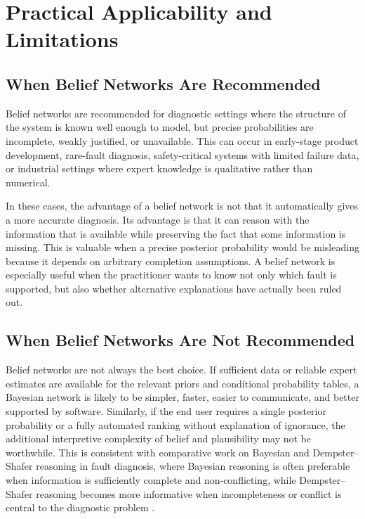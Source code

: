 \documentclass[runningheads]{llncs}
\begin{document}
\section{Practical Applicability and Limitations}
\label{sec:practical_guidance}

\subsection{When Belief Networks Are Recommended}
\label{sec:when_recommended}

Belief networks are recommended for diagnostic settings where the structure of the system is known well enough to model, but precise probabilities are incomplete, weakly justified, or unavailable. This can occur in early-stage product development, rare-fault diagnosis, safety-critical systems with limited failure data, or industrial settings where expert knowledge is qualitative rather than numerical.

In these cases, the advantage of a belief network is not that it automatically gives a more accurate diagnosis. Its advantage is that it can reason with the information that is available while preserving the fact that some information is missing. This is valuable when a precise posterior probability would be misleading because it depends on arbitrary completion assumptions. A belief network is especially useful when the practitioner wants to know not only which fault is supported, but also whether alternative explanations have actually been ruled out.

\subsection{When Belief Networks Are Not Recommended}
\label{sec:when_not_recommended}

Belief networks are not always the best choice. If sufficient data or reliable expert estimates are available for the relevant priors and conditional probability tables, a Bayesian network is likely to be simpler, faster, easier to communicate, and better supported by software. Similarly, if the end user requires a single posterior probability or a fully automated ranking without explanation of ignorance, the additional interpretive complexity of belief and plausibility may not be worthwhile. This is consistent with comparative work on Bayesian and Dempster--Shafer reasoning in fault diagnosis, where Bayesian reasoning is often preferable when information is sufficiently complete and non-conflicting, while Dempster--Shafer reasoning becomes more informative when incompleteness or conflict is central to the diagnostic problem \cite{VerbertBabuskaDeSchutter2017}.
\end{document}
